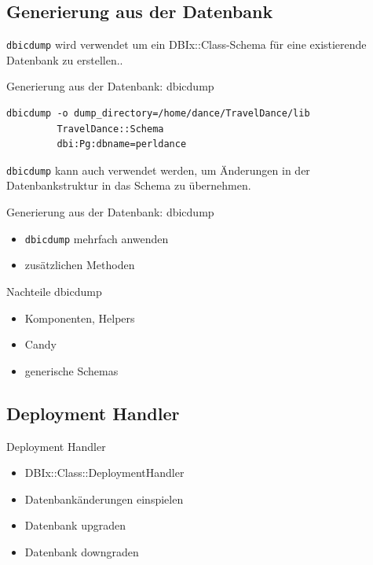 \subsection{Generierung aus der Datenbank}

\verb|dbicdump| wird verwendet um ein DBIx::Class-Schema für eine
existierende Datenbank zu erstellen..

\begin{frame}[fragile]{Generierung aus der Datenbank: dbicdump}
\begin{lstlisting}
dbicdump -o dump_directory=/home/dance/TravelDance/lib 
         TravelDance::Schema 
         dbi:Pg:dbname=perldance
\end{lstlisting}
\end{frame}

\verb|dbicdump| kann auch verwendet werden, um Änderungen in
der Datenbankstruktur in das Schema zu übernehmen.

\begin{frame}[fragile]{Generierung aus der Datenbank: dbicdump}
\begin{itemize}
\item \verb|dbicdump| mehrfach anwenden
\item zusätzlichen Methoden
\end{itemize}
\end{frame}

\begin{frame}[fragile]{Nachteile dbicdump}
\begin{itemize}
\item Komponenten, Helpers
\item Candy
\item generische Schemas
\end{itemize}
\end{frame}

\subsection{Deployment Handler}

\begin{frame}{Deployment Handler}
\begin{itemize}
\item DBIx::Class::DeploymentHandler
\item Datenbankänderungen einspielen
\item Datenbank upgraden
\item Datenbank downgraden
\end{itemize}
\end{frame}

